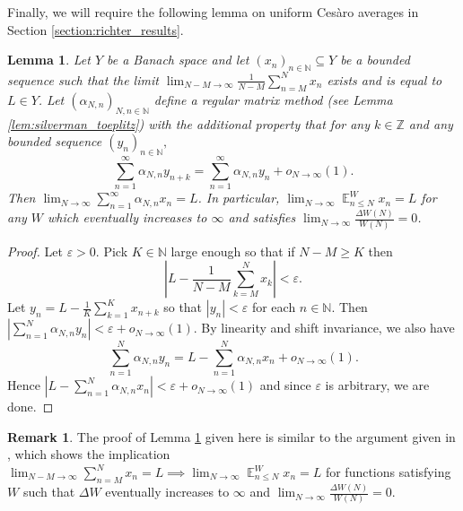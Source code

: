 \documentclass[12pt]{article}
\theoremstyle{plain} %
\newtheorem{lemma}[theorem]{Lemma}
\theoremstyle{definition} %
\newtheorem{remark}[theorem]{Remark}
\theoremstyle{plain}
\theoremstyle{plain}
\numberwithin{equation}{section}
\newcommand{\Cesaro}{Ces\`{a}ro }
\newcommand{\N}{\mathbb{N}}
\newcommand{\Z}{\mathbb{Z}}
\renewcommand{\epsilon}{\varepsilon}
\renewcommand{\leq}{\leqslant}
\renewcommand{\geq}{\geqslant}
\renewcommand{\subset}{\subseteq}
\newcommand{\1}{\mathbbm{1}}
\newcommand{\E}{\operatorname{\mathbb{E}}}
\newcommand{\oo}{\infty}
\begin{document}
Finally, we will require the following lemma on uniform \Cesaro averages in Section \ref{section:richter_results}.
\begin{lemma}\label{lem:wd_means_W_ud}
    Let $Y$ be a Banach space and let $(x_n)_{n\in \N}\subset Y$ be a bounded sequence such that the limit $
        \lim_{N-M\to\oo}\frac{1}{N-M}\sum_{n=M}^Nx_n$ exists and is equal to $L\in Y$. Let $(\alpha_{N,n})_{N,n\in \N}$ define a regular matrix method (see Lemma \ref{lem:silverman_toeplitz}) with the additional property that for any $k\in \Z$ and any bounded sequence $(y_{n})_{n\in \N},$
        $$
        \sum_{n=1}^{\oo}\alpha_{N,n}y_{n+k} = \sum_{n=1}^{\oo}\alpha_{N,n}y_n +o_{N\to\oo}(1).
        $$
        Then $\lim_{N\to\oo} \sum_{n=1}^{\oo}\alpha_{N,n}x_{n}=L$. In particular, $\lim_{N\to\oo}\E_{n\leq N}^Wx_n = L$ for any $W$ which eventually increases to $\oo$ and satisfies $\lim_{N\to\oo}\frac{\Delta W(N)}{W(N)}=0$.
\end{lemma}
\begin{proof}
    Let $\epsilon>0$. Pick $K\in \N$ large enough so that if $N-M\geq K$ then 
    $$
    \left|L-\frac{1}{N-M}\sum_{k=M}^Nx_k\right|<\epsilon.
    $$
    Let $y_n = L-\frac{1}{K}\sum_{k=1}^Kx_{n+k}$ so that $|y_n|<\epsilon$ for each $n\in \N$. Then $\left|\sum_{n=1}^N\alpha_{N,n}y_n\right|<\epsilon+o_{N\to\oo}(1)$. By linearity and shift invariance, we also have 
    $$
    \sum_{n=1}^N\alpha_{N,n}y_n= L - \sum_{n=1}^N\alpha_{N,n}x_n  +o_{N\to\oo}(1).
    $$
    Hence $\left| L - \sum_{n=1}^N\alpha_{N,n}x_n\right|<\epsilon+o_{N\to\oo}(1)$ and since $\epsilon$ is arbitrary, we are done. 
\end{proof}

\begin{remark} The proof of Lemma \ref{lem:wd_means_W_ud} given here is similar to the argument given in \cite[Theorem 3.6]{tempered_functions}, which shows the implication $\lim_{N-M\to\oo}\sum_{n=M}^Nx_n = L \implies \lim_{N\to\oo}\E_{n\leq N}^Wx_n = L$ for functions satisfying $W$ such that $\Delta W$ eventually increases to $\oo$ and $\lim_{N\to\oo}\frac{\Delta W(N)}{W(N)}=0$.
\end{remark}
\end{document}
